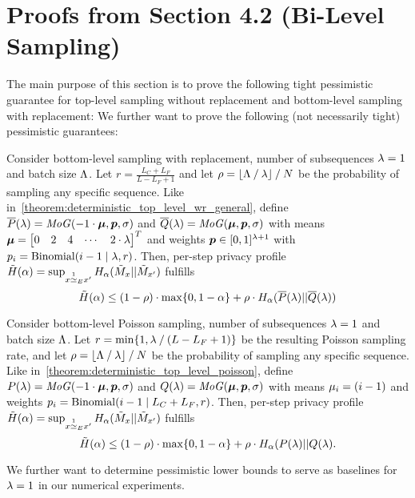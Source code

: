 \section{Proofs from Section 4.2 (Bi-Level Sampling)}\label{appendix:proofs_bilevel}
The main purpose of this section is to prove the following tight pessimistic guarantee
for top-level sampling without replacement and bottom-level sampling with replacement:
\wortoplevelwr*
We further want to prove the following (not necessarily tight) pessimistic guarantees:
\begin{theorem}\label{theorem:wor_top_level_wr_general}
    Consider
    bottom-level sampling with replacement, 
    number of subsequences $\lambda = 1$ and 
    batch size $\Lambda$.
    Let $r = \frac{L_C + L_F}{L - L_F + 1}$ and let 
    $\rho = \lfloor \Lambda \mathbin{/} \lambda \rfloor \mathbin{/} N$ be the probability of sampling any specific sequence. 
    Like in~\cref{theorem:deterministic_top_level_wr_general}, define
    $\overline{P}(\lambda) = \mathit{MoG}(-1 \cdot {\bm{\mu}}, {\bm{p}}, \sigma)$
    and
    $\overline{Q}(\lambda) = \mathit{MoG}({\bm{\mu}}, {\bm{p}}, \sigma)$
    with
    means ${\bm{\mu}} = \begin{bmatrix}
        0 & 2 &  4 & \cdots & 2 \cdot \lambda
    \end{bmatrix}^T$ and 
    weights ${\bm{p}} \in [0,1]^{\lambda + 1}$ with $p_i = \mathrm{Binomial}(i-1 \mid \lambda, r)$.
    Then, per-step privacy profile $\tilde{H}(\alpha) = \sup_{x \overset{1}{\simeq}_{E} x'} H_\alpha(\tilde{M}_x || \tilde{M}_{x'})$ fulfills 
    \begin{equation*}
        \tilde{H}(\alpha) \leq 
        (1-\rho) \cdot \max \{0, 1 - \alpha\}
        +
        \rho \cdot 
            H_\alpha(\overline{P}(\lambda) || \overline{Q}(\lambda))
    \end{equation*}
\end{theorem}
\begin{theorem}\label{theorem:wor_top_level_poisson_general}
    Consider
    bottom-level Poisson sampling, 
    number of subsequences $\lambda = 1$ and 
    batch size $\Lambda$.
    Let $r = \min\{1, \lambda \mathbin{/} (L - L_F + 1)\}$
    be the resulting Poisson sampling rate, 
    and let 
    $\rho = \lfloor \Lambda \mathbin{/} \lambda \rfloor \mathbin{/} N$ be the probability of sampling any specific sequence. 
    Like in~\cref{theorem:deterministic_top_level_poisson}, define
    $P(\lambda) = \mathit{MoG}(-1 \cdot {\bm{\mu}}, {\bm{p}}, \sigma)$ and 
    $Q(\lambda) = \mathit{MoG}({\bm{\mu}}, {\bm{p}}, \sigma)$ with
    means ${\mu}_i = (i - 1)$ and 
    weights ${p}_i = \mathrm{Binomial}(i - 1 \mid L_C + L_F, r)$.
    Then, per-step privacy profile $\tilde{H}(\alpha) = \sup_{x \overset{1}{\simeq}_{E} x'} H_\alpha(\tilde{M}_x || \tilde{M}_{x'})$ fulfills 
    \begin{equation*}
        \tilde{H}(\alpha) \leq
        (1-\rho) \cdot \max \{0, 1 - \alpha \}
        +
        \rho \cdot 
        H_\alpha(P(\lambda) || Q(\lambda).
    \end{equation*}
\end{theorem}
We further want to determine pessimistic lower bounds to serve as baselines for $\lambda = 1$ in our numerical experiments.

